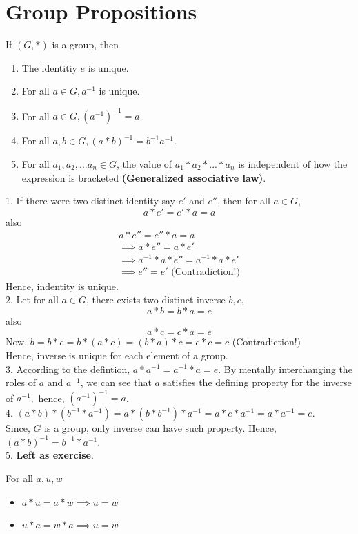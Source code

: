 \section{Group Propositions}
\begin{prop}
    If $(G, *)$ is a group, then
    \begin{enumerate}
        \item The identitiy $e$ is unique.
        \item For all $a \in G, a^{-1}$ is unique.
        \item For all $a \in G, (a^{-1})^{-1} = a$.
        \item For all $a, b \in G, (a * b)^{-1} = b^{-1} a^{-1}.$
        \item For all $a_1, a_2, ... a_n \in G$, the value of $a_1 * a_2 * ... * a_n$ is independent of how the expression is bracketed \textbf{(Generalized associative law)}.
    \end{enumerate}
\end{prop}
\begin{propproof}
    1. If there were two distinct identity say $e'$ and $e''$, then for all $a \in G$, $$a * e' = e' * a = a$$
    also \begin{gather*}
        a * e'' = e'' * a = a\\
        \implies a * e'' = a * e'\\
        \implies a^{-1} * a * e'' = a^{-1} * a * e'\\
        \implies e'' = e' \text{ (Contradiction!)}
    \end{gather*}
    Hence, indentity is unique.\\
    2. Let for all $a \in G$, there exists two distinct inverse $b, c$, $$a * b = b * a = e$$
    also $$a * c = c * a = e$$
    Now, $b = b * e = b * (a*c) = (b * a) * c = e * c = c$ (Contradiction!)\\
    Hence, inverse is unique for each element of a group.\\
    3. According to the defintion, $a * a^{-1} =  a^{-1} * a = e$. By mentally interchanging the roles of $a$ and $a^{-1}$, we can see that $a$ satisfies the defining property for the inverse of $a^{-1},$ hence, $(a^{-1})^{-1}=a$.\\
    4. $(a * b) * (b^{-1} * a^{-1}) = a * (b * b^{-1}) * a^{-1} = a * e * a^{-1} = a * a^{-1} = e.$\\
    Since, $G$ is a group, only inverse can have such property.
    Hence, $(a * b)^{-1} = b^{-1} * a^{-1}.$\\
    5. \textbf{Left as exercise}.
\end{propproof}
\begin{lemma}
    For all $a, u, w$
    \begin{itemize}
        \item $a * u = a * w \implies u = w$ 
        \item $u * a = w * a \implies u = w$
    \end{itemize}
\end{lemma}

